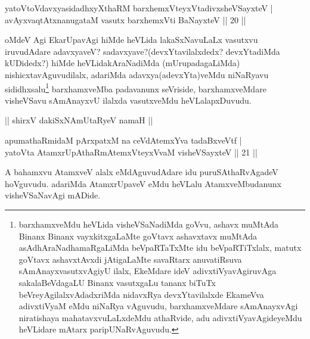 \begin{shl}
yatoV\s toV\s davxyasidadhxyXthaRM barxhemxVteyxVtadivxsheVSayxteV |\\
avAyxvaqtAtxnanugataM vasutx barxhemxVti BaNayxteV \hfill || 20 ||
\end{shl}

\begin{artha}
oMdeV Agi EkarUpavAgi hiMde heVLida lakaSxNavuLaLx vasutxvu iruvudAdare adavxyaveV? sadavxyave?(devxYtavilalxdedx? devxYtadiMda kUDidedx?) hiMde heVLidakAraNadiMda (mUrupadagaLiMda) nishicxtavAguvudilalx, adariMda adavxya(adevxYta)veMdu niNaRyavu sididhxsalu\footnote{barxhamxveMdu heVLida visheVSaNadiMda goVvu, ashavx muMtAda Binanx Binanx vayxkitxgaLaMte goVtavx ashavxtavx muMtAda asAdhAraNadhamaRgaLiMda beVpaRTaTxMte idu beVpaRTiTxlalx, matutx goVtavx ashavxtAvxdi jAtigaLaMte savaRtarx anuvatiRsuva sAmAnayxvasutxvAgiyU ilalx, EkeMdare ideV adivxtiVyavAgiruvAga sakalaBeVdagaLU Binanx vasutxgaLu tananx biTuTx beVreyAgilalxvAdadxriMda nidavxRya devxYtavilalxde EkameVva adivxtiVyaM eMdu niNaRya vAguvudu, barxhamxveMdare sAmAnayxvAgi niratishaya mahatavxvuLaLxdeMdu athaRvide, adu adivxtiVyavAgideyeMdu heVLidare mAtarx paripUNaRvAguvudu.} barxhamxveMba padavanunx seVriside, barxhamxveMdare visheVSavu sAmAnayxvU ilalxda vasutxveMdu heVLalapxDuvudu.
\end{artha}



\begin{center}
|| shirxV dakiSxNAmUtaRyeV namaH ||
\end{center}



\begin{shl}
apumathaRmidaM pArxpatxM na ceVdAtemxYva tadaBxveVtf |\\
yatoV\s ta AtamxrUpAthaRmAtemxVteyxVvaM visheVSayxteV \hfill || 21 ||
\end{shl}

\begin{artha}
A bahamxvu AtamxveV alalx eMdAguvudAdare idu puruSAthaRvAgadeV hoVguvudu. adariMda AtamxrUpaveV eMdu heVLalu 
AtamxveMbudanunx visheVSaNavAgi mADide.
\end{artha}

